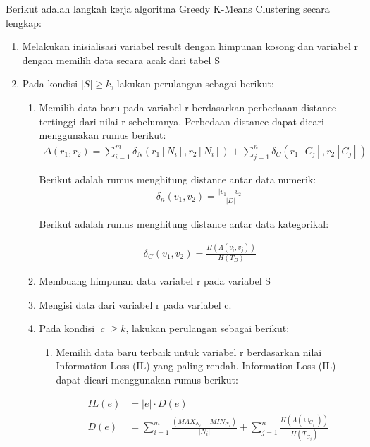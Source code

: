 \noindent Berikut adalah langkah kerja algoritma Greedy K-Means Clustering secara lengkap:

\begin{enumerate}
\item Melakukan inisialisasi variabel result dengan himpunan kosong dan variabel r dengan memilih data secara acak dari tabel S

\item Pada kondisi $|S| \geq k$, lakukan perulangan sebagai berikut:

\begin{enumerate}
\item Memilih data baru pada variabel r berdasarkan perbedaaan distance tertinggi dari nilai r sebelumnya. Perbedaan distance dapat dicari menggunakan rumus berikut:
\begin{align*}
\Delta (r_1,r_2) = \sum_{i=1}^{m} \delta_N(r_1[N_i],r_2	[N_i]) +  \sum_{j=1}^{n} \delta_C(r_1[C_j],r_2[C_j])
\end{align*}

\noindent Berikut adalah rumus menghitung distance antar data numerik:
\begin{align*}
\delta_n(v_1,v_2) = \frac{|v_1 - v_2|}{|D|} 
\end{align*}

\vspace{0.4cm}

\noindent Berikut adalah rumus menghitung distance antar data kategorikal:

\begin{align*}
\delta_C(v_1,v_2) = \frac{H(\Lambda(v_i,v_j))}{H(T_D)} 
\end{align*}

\vspace{0.4cm}

\item Membuang himpunan data variabel r pada variabel S

\item Mengisi data dari variabel r pada variabel c.

\item Pada kondisi $|c| \geq k$, lakukan perulangan sebagai berikut:

\begin{enumerate}
\item Memilih data baru terbaik untuk variabel r berdasarkan nilai Information Loss (IL) yang paling rendah. Information Loss (IL) dapat dicari menggunakan rumus berikut:

\begin{align*}
IL(e)&= |e| \cdot D(e) \\
D(e) &= \sum_{i=1}^{m} \frac{(MAX_{N_i} - MIN_{N_i})}{|N_i|} + \sum_{j=1}^{n}\frac{H(\Lambda(\cup_{C_j}))}{H(T_{C_j})}
\end{align*}


\end{enumerate}
\end{enumerate}
\end{enumerate}

